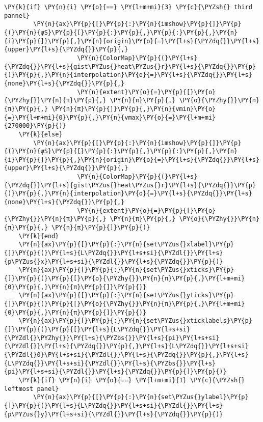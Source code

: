 \begin{Verbatim}[commandchars=\\\{\}]
    \PY{k}{if} \PY{n}{i} \PY{o}{==} \PY{l+m+mi}{3} \PY{c}{\PYZsh{} third pannel}
        \PY{n}{ax}\PY{p}{[}\PY{p}{:}\PY{n}{imshow}\PY{p}{]}\PY{p}{(}\PY{n}{ψS}\PY{p}{[}\PY{p}{:}\PY{p}{,}\PY{p}{:}\PY{p}{,}\PY{n}{i}\PY{p}{]}\PY{p}{,}\PY{n}{origin}\PY{o}{=}\PY{l+s}{\PYZdq{}}\PY{l+s}{upper}\PY{l+s}{\PYZdq{}}\PY{p}{,}
                    \PY{n}{ColorMap}\PY{p}{(}\PY{l+s}{\PYZdq{}}\PY{l+s}{gist\PYZus{}heat\PYZus{}r}\PY{l+s}{\PYZdq{}}\PY{p}{)}\PY{p}{,}\PY{n}{interpolation}\PY{o}{=}\PY{l+s}{\PYZdq{}}\PY{l+s}{none}\PY{l+s}{\PYZdq{}}\PY{p}{,}
                    \PY{n}{extent}\PY{o}{=}\PY{p}{[}\PY{o}{\PYZhy{}}\PY{n}{π}\PY{p}{,} \PY{n}{π}\PY{p}{,} \PY{o}{\PYZhy{}}\PY{n}{π}\PY{p}{,} \PY{n}{π}\PY{p}{]}\PY{p}{,}\PY{n}{vmin}\PY{o}{=}\PY{l+m+mi}{0}\PY{p}{,}\PY{n}{vmax}\PY{o}{=}\PY{l+m+mi}{270000}\PY{p}{)}
    \PY{k}{else}
        \PY{n}{ax}\PY{p}{[}\PY{p}{:}\PY{n}{imshow}\PY{p}{]}\PY{p}{(}\PY{n}{ψS}\PY{p}{[}\PY{p}{:}\PY{p}{,}\PY{p}{:}\PY{p}{,}\PY{n}{i}\PY{p}{]}\PY{p}{,}\PY{n}{origin}\PY{o}{=}\PY{l+s}{\PYZdq{}}\PY{l+s}{upper}\PY{l+s}{\PYZdq{}}\PY{p}{,}
                    \PY{n}{ColorMap}\PY{p}{(}\PY{l+s}{\PYZdq{}}\PY{l+s}{gist\PYZus{}heat\PYZus{}r}\PY{l+s}{\PYZdq{}}\PY{p}{)}\PY{p}{,}\PY{n}{interpolation}\PY{o}{=}\PY{l+s}{\PYZdq{}}\PY{l+s}{none}\PY{l+s}{\PYZdq{}}\PY{p}{,}
                    \PY{n}{extent}\PY{o}{=}\PY{p}{[}\PY{o}{\PYZhy{}}\PY{n}{π}\PY{p}{,} \PY{n}{π}\PY{p}{,} \PY{o}{\PYZhy{}}\PY{n}{π}\PY{p}{,} \PY{n}{π}\PY{p}{]}\PY{p}{)}
    \PY{k}{end}
    \PY{n}{ax}\PY{p}{[}\PY{p}{:}\PY{n}{set\PYZus{}xlabel}\PY{p}{]}\PY{p}{(}\PY{l+s}{L\PYZdq{}}\PY{l+s+si}{\PYZdl{}}\PY{l+s}{p\PYZus{}x}\PY{l+s+si}{\PYZdl{}}\PY{l+s}{\PYZdq{}}\PY{p}{)}
    \PY{n}{ax}\PY{p}{[}\PY{p}{:}\PY{n}{set\PYZus{}xticks}\PY{p}{]}\PY{p}{(}\PY{p}{[}\PY{o}{\PYZhy{}}\PY{n}{π}\PY{p}{,}\PY{l+m+mi}{0}\PY{p}{,}\PY{n}{π}\PY{p}{]}\PY{p}{)}
    \PY{n}{ax}\PY{p}{[}\PY{p}{:}\PY{n}{set\PYZus{}yticks}\PY{p}{]}\PY{p}{(}\PY{p}{[}\PY{o}{\PYZhy{}}\PY{n}{π}\PY{p}{,}\PY{l+m+mi}{0}\PY{p}{,}\PY{n}{π}\PY{p}{]}\PY{p}{)}
    \PY{n}{ax}\PY{p}{[}\PY{p}{:}\PY{n}{set\PYZus{}xticklabels}\PY{p}{]}\PY{p}{(}\PY{p}{[}\PY{l+s}{L\PYZdq{}}\PY{l+s+si}{\PYZdl{}\PYZhy{}}\PY{l+s}{\PYZbs{}}\PY{l+s}{pi}\PY{l+s+si}{\PYZdl{}}\PY{l+s}{\PYZdq{}}\PY{p}{,}\PY{l+s}{L\PYZdq{}}\PY{l+s+si}{\PYZdl{}0}\PY{l+s+si}{\PYZdl{}}\PY{l+s}{\PYZdq{}}\PY{p}{,}\PY{l+s}{L\PYZdq{}}\PY{l+s+si}{\PYZdl{}}\PY{l+s}{\PYZbs{}}\PY{l+s}{pi}\PY{l+s+si}{\PYZdl{}}\PY{l+s}{\PYZdq{}}\PY{p}{]}\PY{p}{)}
    \PY{k}{if} \PY{n}{i} \PY{o}{==} \PY{l+m+mi}{1} \PY{c}{\PYZsh{} leftmost panel}
        \PY{n}{ax}\PY{p}{[}\PY{p}{:}\PY{n}{set\PYZus{}ylabel}\PY{p}{]}\PY{p}{(}\PY{l+s}{L\PYZdq{}}\PY{l+s+si}{\PYZdl{}}\PY{l+s}{p\PYZus{}y}\PY{l+s+si}{\PYZdl{}}\PY{l+s}{\PYZdq{}}\PY{p}{)}

\end{Verbatim}
